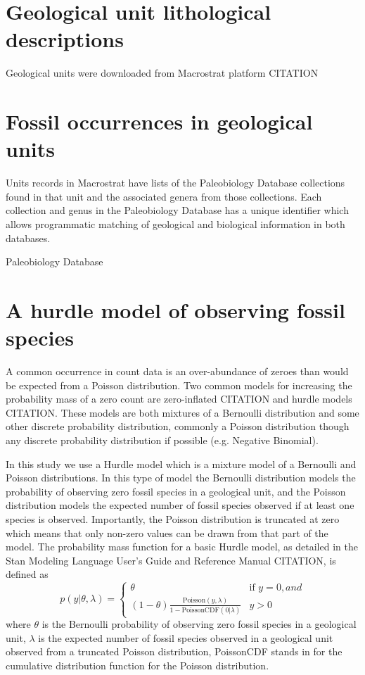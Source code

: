 \documentclass[12pt,letterpaper]{article}
\begin{document}
\section{Geological unit lithological descriptions}
Geological units were downloaded from Macrostrat platform CITATION 


\section{Fossil occurrences in geological units}
Units records in Macrostrat have lists of the Paleobiology Database collections found in that unit and the associated genera from those collections. Each collection and genus in the Paleobiology Database has a unique identifier which allows programmatic matching of geological and biological information in both databases.


Paleobiology Database




\section{A hurdle model of observing fossil species}

A common occurrence in count data is an over-abundance of zeroes than would be expected from a Poisson distribution. Two common models for increasing the probability mass of a zero count are zero-inflated CITATION and hurdle models CITATION. These models are both mixtures of a Bernoulli distribution and some other discrete probability distribution, commonly a Poisson distribution though any discrete probability distribution if possible (e.g. Negative Binomial).

In this study we use a Hurdle model which is a mixture model of a Bernoulli and Poisson distributions. In this type of model the Bernoulli distribution models the probability of observing zero fossil species in a geological unit, and the Poisson distribution models the expected number of fossil species observed if at least one species is observed. Importantly, the Poisson distribution is truncated at zero which means that only non-zero values can be drawn from that part of the model. The probability mass function for a basic Hurdle model, as detailed in the Stan Modeling Language User's Guide and Reference Manual CITATION, is defined as 
\begin{equation}
  p(y | \theta, \lambda)  = 
  \begin{cases}
    \theta & \text{if } y = 0, and \\
    (1 - \theta) \frac{\text{Poisson}(y, \lambda)}{1 - \text{PoissonCDF}(0 | \lambda)} & y > 0
  \end{cases}
  \label{eq:hurdle_ex}
\end{equation}
where \(\theta\) is the Bernoulli probability of observing zero fossil species in a geological unit, \(\lambda\) is the expected number of fossil species observed in a geological unit observed from a truncated Poisson distribution, PoissonCDF stands in for the cumulative distribution function for the Poisson distribution.
\end{document}
